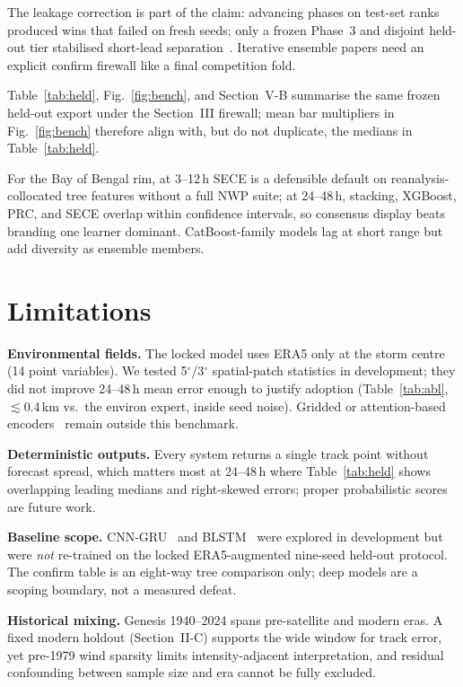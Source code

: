 \documentclass[conference]{IEEEtran}
\newcommand{\sece}{SECE}
\newcommand{\bob}{Bay of Bengal}
\newcommand{\era}{ERA5}
\begin{document}
The leakage correction is part of the claim: advancing phases on test-set ranks
produced wins that failed on fresh seeds; only a frozen Phase~3 and disjoint
held-out tier stabilised short-lead separation~\cite{cawley2010}. Iterative
ensemble papers need an explicit confirm firewall like a final competition fold.

Table~\ref{tab:held}, Fig.~\ref{fig:bench}, and Section~V-B summarise the same
frozen held-out export under the Section~III firewall; mean bar multipliers in
Fig.~\ref{fig:bench} therefore align with, but do not duplicate, the medians in
Table~\ref{tab:held}.

For the \bob{} rim, at 3--12\,h \sece{} is a defensible default on
reanalysis-collocated tree features without a full NWP suite; at 24--48\,h,
stacking, XGBoost, PRC, and \sece{} overlap within confidence intervals, so
consensus display beats branding one learner dominant. CatBoost-family models
lag at short range but add diversity as ensemble members.

\section{Limitations}
\textbf{Environmental fields.} The locked model uses \era{} only at the storm
centre (14 point variables). We tested 5$^\circ$/3$^\circ$ spatial-patch
statistics in development; they did not improve 24--48\,h mean error enough to
justify adoption (Table~\ref{tab:abl}, $\lesssim$0.4\,km vs.\ the environ expert,
inside seed noise). Gridded or attention-based encoders~\cite{giffard2020tropical,qu2025accurate,vaswani2017attention} remain outside this benchmark.

\textbf{Deterministic outputs.} Every system returns a single track point without
forecast spread, which matters most at 24--48\,h where Table~\ref{tab:held} shows
overlapping leading medians and right-skewed errors; proper probabilistic scores~\cite{gneiting2007} are future work.

\textbf{Baseline scope.} CNN-GRU~\cite{lian2020novel} and BLSTM~\cite{graves2005blstm}
were explored in development but were \emph{not} re-trained on the locked
\era{}-augmented nine-seed held-out protocol. The confirm table is an eight-way
tree comparison only; deep models are a scoping boundary, not a measured defeat.

\textbf{Historical mixing.} Genesis 1940--2024 spans pre-satellite and modern
eras. A fixed modern holdout (Section~II-C) supports the wide window for track
error, yet pre-1979 wind sparsity limits intensity-adjacent interpretation, and
residual confounding between sample size and era cannot be fully excluded.
\end{document}
